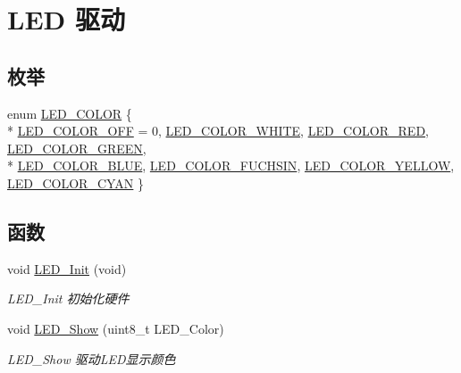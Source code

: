 \hypertarget{group__led__driver}{}\section{L\+ED 驱动}
\label{group__led__driver}
\subsection*{枚举}
\begin{DoxyCompactItemize}
\item 
enum \hyperlink{group__led__driver_ga1f3289eeddfbcff1515a3786dc0518fa}{L\+E\+D\+\_\+\+C\+O\+L\+OR} \{ \\*
\hyperlink{group__led__driver_gga1f3289eeddfbcff1515a3786dc0518faafea1b6d1e36efeb9177297ad5b634bdd}{L\+E\+D\+\_\+\+C\+O\+L\+O\+R\+\_\+\+O\+FF} = 0, 
\hyperlink{group__led__driver_gga1f3289eeddfbcff1515a3786dc0518faae0568a71373a19d68ac019a67fcb2c3b}{L\+E\+D\+\_\+\+C\+O\+L\+O\+R\+\_\+\+W\+H\+I\+TE}, 
\hyperlink{group__led__driver_gga1f3289eeddfbcff1515a3786dc0518faa20c3f7e3db2eca4ce0fe784975373384}{L\+E\+D\+\_\+\+C\+O\+L\+O\+R\+\_\+\+R\+ED}, 
\hyperlink{group__led__driver_gga1f3289eeddfbcff1515a3786dc0518faa64cda76c497793915fcf24c216d0f37c}{L\+E\+D\+\_\+\+C\+O\+L\+O\+R\+\_\+\+G\+R\+E\+EN}, 
\\*
\hyperlink{group__led__driver_gga1f3289eeddfbcff1515a3786dc0518faa457a1e8f0680efd8cf6d76d1a6465b2b}{L\+E\+D\+\_\+\+C\+O\+L\+O\+R\+\_\+\+B\+L\+UE}, 
\hyperlink{group__led__driver_gga1f3289eeddfbcff1515a3786dc0518faa323d8bd5ea675c6701c2945fb2e124bd}{L\+E\+D\+\_\+\+C\+O\+L\+O\+R\+\_\+\+F\+U\+C\+H\+S\+IN}, 
\hyperlink{group__led__driver_gga1f3289eeddfbcff1515a3786dc0518faab792f0e1b8644f6f22f3f0ab799bd3a9}{L\+E\+D\+\_\+\+C\+O\+L\+O\+R\+\_\+\+Y\+E\+L\+L\+OW}, 
\hyperlink{group__led__driver_gga1f3289eeddfbcff1515a3786dc0518faa20221062a48820a1e6caabc3fe8c0723}{L\+E\+D\+\_\+\+C\+O\+L\+O\+R\+\_\+\+C\+Y\+AN}
 \}
\end{DoxyCompactItemize}
\subsection*{函数}
\begin{DoxyCompactItemize}
\item 
void \hyperlink{group__led__driver_gab3570a8c9e1266519ad1c7e00093812b}{L\+E\+D\+\_\+\+Init} (void)\hypertarget{group__led__driver_gab3570a8c9e1266519ad1c7e00093812b}{}\label{group__led__driver_gab3570a8c9e1266519ad1c7e00093812b}

\begin{DoxyCompactList}\small\item\em L\+E\+D\+\_\+\+Init 初始化硬件 \end{DoxyCompactList}\item 
void \hyperlink{group__led__driver_ga350a74376d1b61d6ff5cf72b66136059}{L\+E\+D\+\_\+\+Show} (uint8\+\_\+t L\+E\+D\+\_\+\+Color)
\begin{DoxyCompactList}\small\item\em L\+E\+D\+\_\+\+Show 驱动\+L\+E\+D显示颜色 \end{DoxyCompactList}\end{DoxyCompactItemize}


